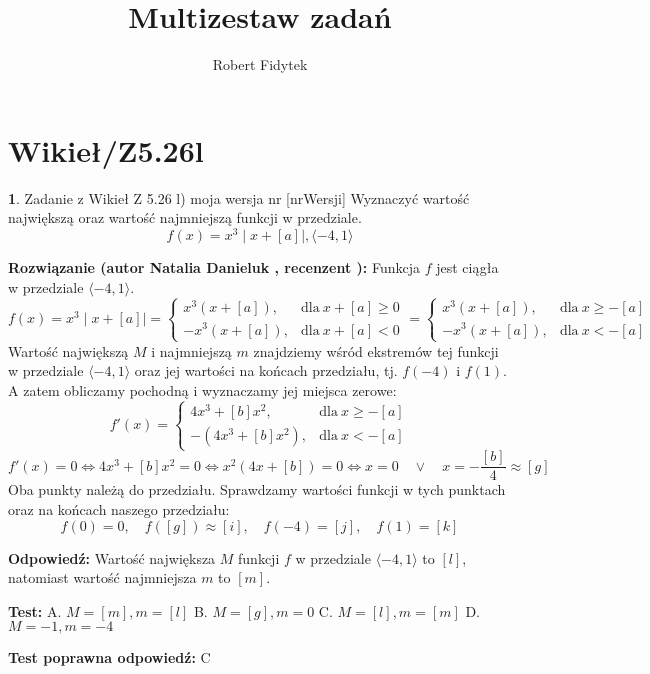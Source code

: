 \documentclass[12pt, a4paper]{article}
\title{Multizestaw zadań}
\author{Robert Fidytek}
\date{}
\theoremstyle{definition} %
\newtheorem{zad}{}
\newcommand{\kategoria}[1]{\section{#1}} %
\newcommand{\zadStart}[1]{\begin{zad}#1\newline} %
\newcommand{\zadStop}{\end{zad}}   %
\newcommand{\rozwStart}[2]{\noindent \textbf{Rozwiązanie (autor #1 , recenzent #2): }\newline} %
\newcommand{\rozwStop}{\newline}                                            %
\newcommand{\odpStart}{\noindent \textbf{Odpowiedź:}\newline}    %
\newcommand{\odpStop}{\newline}                                             %
\newcommand{\testStart}{\noindent \textbf{Test:}\newline} %
\newcommand{\testStop}{\newline} %
\newcommand{\kluczStart}{\noindent \textbf{Test poprawna odpowiedź:}\newline} %
\newcommand{\kluczStop}{\newline} %
\begin{document}
\maketitle

\kategoria{Wikieł/Z5.26l}

\zadStart{Zadanie z Wikieł Z 5.26 l) moja wersja nr [nrWersji]}
Wyznaczyć wartość największą oraz wartość najmniejszą funkcji w przedziale. 
$$f(x) = x^3\mid x + [a] \mid, \langle-4,1\rangle$$
\zadStop

\rozwStart{Natalia Danieluk}{}
Funkcja $f$ jest ciągła w przedziale $\langle-4,1\rangle$. 
$$ f(x) = x^3\mid x + [a] \mid =  
\begin{cases} 
x^3(x + [a]), & \text{dla} \ x + [a] \ge 0 \\
- x^3(x + [a]), & \text{dla}\ x + [a] < 0
\end{cases} 
=  
\begin{cases} 
x^3(x + [a]), & \text{dla} \ x \ge - [a] \\
- x^3(x + [a]), & \text{dla}\ x < - [a]
\end{cases} 
$$
Wartość największą $M$ i najmniejszą $m$ znajdziemy wśród ekstremów tej funkcji w przedziale $\langle-4,1\rangle$ oraz jej wartości na końcach przedziału, tj. $f(-4)$ i $f(1)$. \\
A zatem obliczamy pochodną i wyznaczamy jej miejsca zerowe:
$$ f'(x) = 
\begin{cases} 
4x^3 + [b]x^2, & \text{dla} \ x \ge - [a] \\
- (4x^3 + [b]x^2), & \text{dla}\ x < - [a]
\end{cases} 
$$
$$ f'(x) = 0 \Leftrightarrow 4x^3 + [b]x^2 = 0 \Leftrightarrow x^2(4x + [b]) = 0 \Leftrightarrow x = 0 \quad \lor \quad x = -\frac{[b]}{4} \approx [g] $$ 
Oba punkty należą do przedziału. Sprawdzamy wartości funkcji w tych punktach oraz na końcach naszego przedziału: \\
$$ f(0) = 0,\quad f([g]) \approx [i],\quad f(-4) = [j],\quad f(1) = [k] $$
\rozwStop
\rozwStop

\odpStart
Wartość największa $M$ funkcji $f$ w przedziale $\langle-4,1\rangle$ to $[l]$, natomiast wartość najmniejsza $m$ to $[m]$.
\odpStop

\testStart
A. $M=[m], m=[l]$
B. $M=[g], m=0$
C. $M=[l], m=[m]$
D. $M=-1, m=-4$
\testStop

\kluczStart
C
\kluczStop
\end{document}
